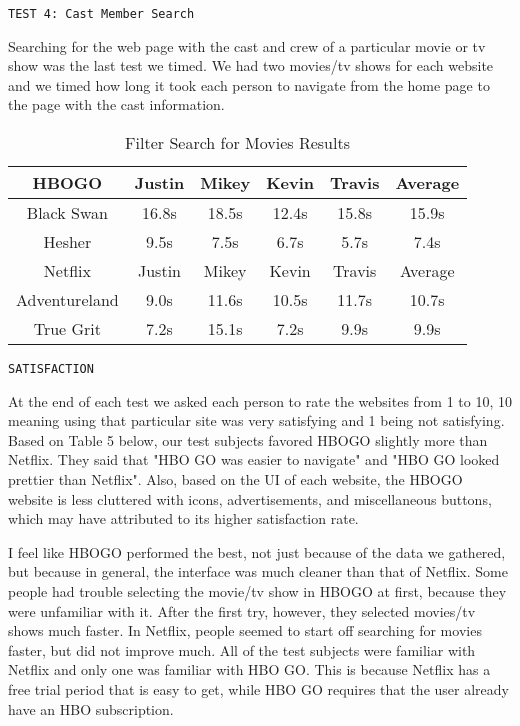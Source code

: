 \documentclass[11pt]{article}
\begin{document}
\begin{verbatim}
TEST 4: Cast Member Search
\end{verbatim}
Searching for the web page with the cast and crew of a particular movie or tv show was the last test we timed. We had two movies/tv shows for each website and we timed how long it took each person to navigate from the home page to the page with the cast information.

\begin{table}[ht]
\caption{Filter Search for Movies Results} 				%
\centering 									%
\begin{tabular}{|c|c c c c|c|} %
\hline\hline 									%
HBOGO  &Justin& Mikey&Kevin&Travis&Average  \\ [0.5ex] 	    %
\hline 									    %
Black Swan  &16.8s & 18.5s&12.4s&15.8s&15.9s          \\			 %
Hesher &9.5s&7.5s&6.7s&5.7s&7.4s                             \\
\hline
Netflix &Justin& Mikey&Kevin&Travis&Average   \\ [0.5ex] 			%
\hline
Adventureland &9.0s&11.6s&10.5s&11.7s&10.7s          \\
True Grit &7.2s&15.1s&7.2s&9.9s&9.9s                         \\
\hline 										%
\end{tabular}
\label{table:nonlin} %
\end{table}

\begin{verbatim}
SATISFACTION
\end{verbatim}
At the end of each test we asked each person to rate the websites from 1 to 10, 10 meaning using that particular site was very satisfying and 1 being not satisfying. Based on Table 5 below, our test subjects favored HBOGO slightly more than Netflix. They said that "HBO GO was easier to navigate" and "HBO GO looked prettier than Netflix". Also, based on the UI of each website, the HBOGO website is less cluttered with icons, advertisements, and miscellaneous buttons, which may have attributed to its higher satisfaction rate.

I feel like HBOGO performed the best, not just because of the data we gathered, but because in general, the interface was much cleaner than that of Netflix. Some people had trouble selecting the movie/tv show in HBOGO at first, because they were unfamiliar with it. After the first try, however, they selected movies/tv shows much faster. In Netflix, people seemed to start off searching for movies faster, but did not improve much. All of the test subjects were familiar with Netflix and only one was familiar with HBO GO. This is because Netflix has a free trial period that is easy to get, while HBO GO requires that the user already have an HBO subscription.
\end{document}
